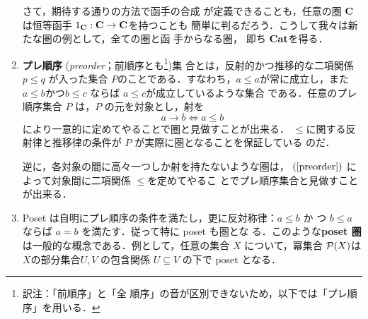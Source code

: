 \begin{enumerate}
\begin{center}
       \end{center}

       さて，期待する通りの方法で函手の合成
       が定義できることも，任意の圏
       ${\bf C}$は恒等函手
       $1_{\bf C} : {\bf C} \to {\bf C}$を持つことも
       簡単に判るだろう．こうして我々は新たな圏の例として，全ての圏と函
       手からなる圏， 即ち
       $\mathbf{Cat}$を得る．
 \item {\bfseries プレ順序}
       ({\itshape preorder}；前順序とも\footnote{訳注：「前順序」と「全
       順序」の音が区別できないため，以下では「プレ順序」を用いる．})集
       合とは，反射的かつ推移的な二項関係 $p\leq q$ が入った集合
       $P$のことである．すなわち，$a \leq a$が常に成立し，また
       $a \leq b$かつ$b\leq c$ ならば $a \leq c$が成立しているような集合
       である．任意のプレ順序集合 $P$ は，$P$ の元を対象とし，射を
       \begin{equation}
	a \to b \iff a \leq b \label{preorder}
       \end{equation}
       により一意的に定めてやることで圏と見做すことが出来る．
       $\leq$に関する反射律と推移律の条件が $P$ が実際に圏となることを保証している
       のだ．

       逆に，各対象の間に高々一つしか射を持たないような圏は，
       $(\ref{preorder})$ によって対象間に二項関係 $\leq $を定めてやるこ
       とでプレ順序集合と見做すことが出来る．
 \item Poset は自明にプレ順序の条件を満たし，更に反対称律：$a \leq b$ か
       つ $b \leq a$ ならば $a = b$ を満たす．従って特に poset も圏とな
       る．このような{\bfseries poset 圏}
       は一般的な概念である．例として，任意の集合 $X$ について，冪集合
       $\mathcal{P}(X)$は$X$の部分集合$U, V$ の包含関係 $U \subseteq V$
       の下で poset となる．


\end{enumerate}
